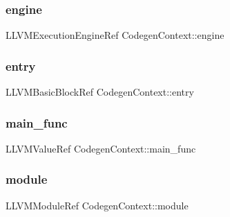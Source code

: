 \hypertarget{structCodegenContext_a4625384998aaebea963f363cd65280f4}{}\label{structCodegenContext_a4625384998aaebea963f363cd65280f4} 
\subsubsection{\texorpdfstring{engine}{engine}}
{\footnotesize\ttfamily L\+L\+V\+M\+Execution\+Engine\+Ref Codegen\+Context\+::engine}

\hypertarget{structCodegenContext_ad125dcf377ccf9bb51c76ad5f7ea4893}{}\label{structCodegenContext_ad125dcf377ccf9bb51c76ad5f7ea4893} 
\subsubsection{\texorpdfstring{entry}{entry}}
{\footnotesize\ttfamily L\+L\+V\+M\+Basic\+Block\+Ref Codegen\+Context\+::entry}

\hypertarget{structCodegenContext_ae1f620a3a813e81a22cc680c1230dbbe}{}\label{structCodegenContext_ae1f620a3a813e81a22cc680c1230dbbe} 
\subsubsection{\texorpdfstring{main\+\_\+func}{main\_func}}
{\footnotesize\ttfamily L\+L\+V\+M\+Value\+Ref Codegen\+Context\+::main\+\_\+func}

\hypertarget{structCodegenContext_aceee13ba95887eb4091ebcf212d1185b}{}\label{structCodegenContext_aceee13ba95887eb4091ebcf212d1185b} 
\subsubsection{\texorpdfstring{module}{module}}
{\footnotesize\ttfamily L\+L\+V\+M\+Module\+Ref Codegen\+Context\+::module}

\hypertarget{structCodegenContext_ad4ea79e948ba98ef14cca2b05d9b23f9}{}\label{structCodegenContext_ad4ea79e948ba98ef14cca2b05d9b23f9} 
